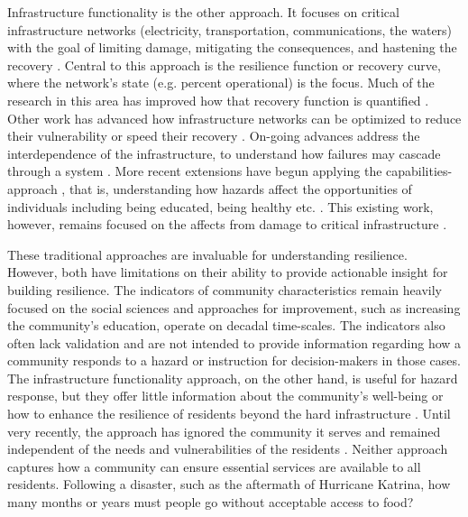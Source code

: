 \documentclass[9pt,twocolumn,twoside,lineno]{pnas-new}
\begin{document}
Infrastructure functionality is the other approach.
It focuses on critical infrastructure networks (electricity, transportation, communications, the waters) with the goal of limiting damage, mitigating the consequences, and hastening the recovery \cite{Bruneau2003-px, Barker2013-od, Hosseini2016-pm, Haimes2009-gj, Guidotti2016-vu, Curt2018-kl}.
Central to this approach is the resilience function or recovery curve, where the network's state (e.g. percent operational) is the focus.
Much of the research in this area has improved how that recovery function is quantified \cite{Bruneau2003-px, Chang2004-et, Cimellaro2010-ov, Vugrin2010-vy, Ayyub2014-mf, Sharma2018-rs}.
Other work has advanced how infrastructure networks can be optimized to reduce their vulnerability or speed their recovery \cite{Hosseini2016-pm}.
On-going advances address the interdependence of the infrastructure, to understand how failures may cascade through a system \cite{Guidotti2016-vu, Gardoni2018-xu}.
More recent extensions have begun applying the capabilities-approach \cite{Murphy2006-io}, that is, understanding how hazards affect the opportunities of individuals including being educated, being healthy etc. \cite{Gardoni2018-xu}. 
This existing work, however, remains focused on the affects from damage to critical infrastructure \cite{Guidotti2019-fc}.

These traditional approaches are invaluable for understanding resilience. 
However, both have limitations on their ability to provide actionable insight for building resilience.
The indicators of community characteristics remain heavily focused on the social sciences \cite{Koliou2018-jt} and approaches for improvement, such as increasing the community's education, operate on decadal time-scales.
The indicators also often lack validation \cite{Bakkensen2016-ht} and are not intended to provide information regarding how a community responds to a hazard or instruction for decision-makers in those cases.
The infrastructure functionality approach, on the other hand, is useful for hazard response, but they offer little information about the community's well-being or how to enhance the resilience of residents beyond the hard infrastructure \cite{Doorn2018-fx}. 
Until very recently, the approach has ignored the community it serves and remained independent of the needs and vulnerabilities of the residents \cite{Cutter2008-placeBasedModel, Cutter2010-vg}.
Neither approach captures how a community can ensure essential services are available to all residents. 
Following a disaster, such as the aftermath of Hurricane Katrina, how many months or years must people go without acceptable access to food?
\end{document}
